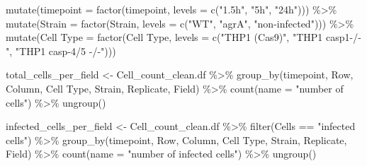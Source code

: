 \documentclass[
]{article}
\newenvironment{Shaded}{\begin{snugshade}}{\end{snugshade}}
\newcommand{\AttributeTok}[1]{\textcolor[rgb]{0.77,0.63,0.00}{#1}}
\newcommand{\FunctionTok}[1]{\textcolor[rgb]{0.00,0.00,0.00}{#1}}
\newcommand{\NormalTok}[1]{#1}
\newcommand{\OtherTok}[1]{\textcolor[rgb]{0.56,0.35,0.01}{#1}}
\newcommand{\SpecialCharTok}[1]{\textcolor[rgb]{0.00,0.00,0.00}{#1}}
\newcommand{\StringTok}[1]{\textcolor[rgb]{0.31,0.60,0.02}{#1}}
\begin{document}
\begin{Shaded}
\begin{Highlighting}[]
  \FunctionTok{mutate}\NormalTok{(}\AttributeTok{timepoint =} \FunctionTok{factor}\NormalTok{(timepoint, }\AttributeTok{levels =} \FunctionTok{c}\NormalTok{(}\StringTok{"1.5h"}\NormalTok{, }\StringTok{"5h"}\NormalTok{, }\StringTok{"24h"}\NormalTok{))) }\SpecialCharTok{\%\textgreater{}\%}
  \FunctionTok{mutate}\NormalTok{(}\AttributeTok{Strain =} \FunctionTok{factor}\NormalTok{(Strain, }\AttributeTok{levels =} \FunctionTok{c}\NormalTok{(}\StringTok{"WT"}\NormalTok{, }\StringTok{"agrA"}\NormalTok{, }\StringTok{"non{-}infected"}\NormalTok{))) }\SpecialCharTok{\%\textgreater{}\%}
  \FunctionTok{mutate}\NormalTok{(}\StringTok{\textasciigrave{}}\AttributeTok{Cell Type}\StringTok{\textasciigrave{}} \OtherTok{=} \FunctionTok{factor}\NormalTok{(}\StringTok{\textasciigrave{}}\AttributeTok{Cell Type}\StringTok{\textasciigrave{}}\NormalTok{, }\AttributeTok{levels =} \FunctionTok{c}\NormalTok{(}\StringTok{"THP1 (Cas9)"}\NormalTok{, }\StringTok{"THP1 casp1{-}/{-}"}\NormalTok{, }\StringTok{"THP1 casp{-}4/5 {-}/{-}"}\NormalTok{))) }



\NormalTok{total\_cells\_per\_field }\OtherTok{\textless{}{-}}\NormalTok{ Cell\_count\_clean.df  }\SpecialCharTok{\%\textgreater{}\%} \FunctionTok{group\_by}\NormalTok{(timepoint,  Row, Column, }\StringTok{\textasciigrave{}}\AttributeTok{Cell Type}\StringTok{\textasciigrave{}}\NormalTok{, Strain, Replicate, Field) }\SpecialCharTok{\%\textgreater{}\%}
  \FunctionTok{count}\NormalTok{(}\AttributeTok{name =} \StringTok{"number of cells"}\NormalTok{) }\SpecialCharTok{\%\textgreater{}\%}
  \FunctionTok{ungroup}\NormalTok{()}

\NormalTok{infected\_cells\_per\_field }\OtherTok{\textless{}{-}}\NormalTok{ Cell\_count\_clean.df }\SpecialCharTok{\%\textgreater{}\%}
  \FunctionTok{filter}\NormalTok{(Cells }\SpecialCharTok{==} \StringTok{"infected cells"}\NormalTok{) }\SpecialCharTok{\%\textgreater{}\%}
  \FunctionTok{group\_by}\NormalTok{(timepoint,  Row, Column, }\StringTok{\textasciigrave{}}\AttributeTok{Cell Type}\StringTok{\textasciigrave{}}\NormalTok{, Strain, Replicate, Field) }\SpecialCharTok{\%\textgreater{}\%}
  \FunctionTok{count}\NormalTok{(}\AttributeTok{name =} \StringTok{"number of infected cells"}\NormalTok{) }\SpecialCharTok{\%\textgreater{}\%}
  \FunctionTok{ungroup}\NormalTok{()}


\end{Highlighting}
\end{Shaded}
\end{document}
